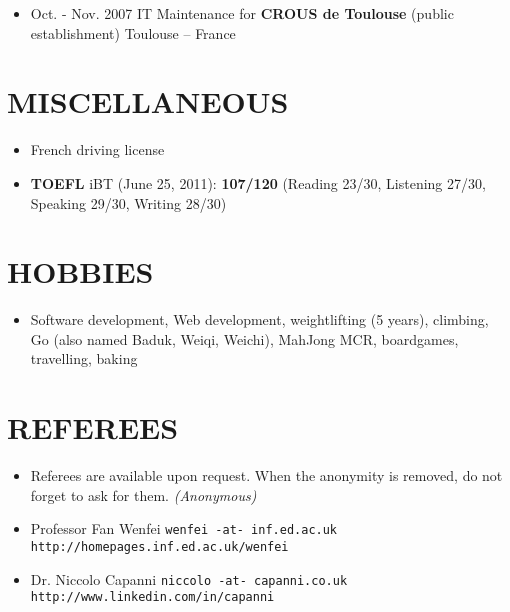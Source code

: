 \documentclass{res}
\begin{document}
\begin{resume}
\begin{itemize}
                \item[] Oct. - Nov. 2007 \tabto{5cm} IT Maintenance for \textbf{CROUS de Toulouse} (public establishment) \hfill Toulouse -- France
        \end{itemize}
        
\section{MISCELLANEOUS}  
        \begin{itemize}
                \item[] French driving license
                \item[] \textbf{TOEFL} iBT (June 25, 2011): \textbf{107/120} (Reading 23/30, Listening 27/30, Speaking 29/30, Writing 28/30)
                    \end{itemize} 
 
\section{HOBBIES}         
        \begin{itemize}
                \item[] Software development, Web development, weightlifting (5 years), climbing, Go (also named Baduk, Weiqi, Weichi), MahJong MCR, boardgames, travelling, baking
        \end{itemize}

\section{REFEREES}
\ifisanon 
     \begin{itemize}
         \item[] Referees are available upon request. When the anonymity is removed, do not forget to ask for them. \textit{(Anonymous)}
     \end{itemize}
\else
                \begin{itemize}
                        \item[] Professor Fan Wenfei \tabto{5cm} \texttt{wenfei -at- inf.ed.ac.uk} \hfill \texttt{http://homepages.inf.ed.ac.uk/wenfei}
                        \item[] Dr. Niccolo Capanni \tabto{5cm} \texttt{niccolo -at- capanni.co.uk} \hfill \texttt{http://www.linkedin.com/in/capanni}
                \end{itemize}
\fi
\end{resume} 
\end{document}
